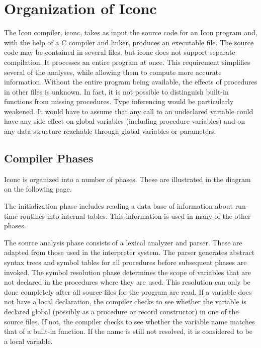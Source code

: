 \chapter{Organization of Iconc}

The Icon compiler, iconc, takes as input the source code for an Icon
program and, with the help of a C compiler and linker, produces an
executable file. The source code may be contained in several files,
but iconc does not support separate compilation. It processes an
entire program at once. This requirement simplifies several of the
analyses, while allowing them to compute more accurate
information. Without the entire program being available, the effects
of procedures in other files is unknown. In fact, it is not possible
to distinguish built-in functions from missing procedures. Type
inferencing would be particularly weakened. It would have to assume
that any call to an undeclared variable could have any side effect on
global variables (including procedure variables) and on any data
structure reachable through global variables or parameters.


\section{Compiler Phases}

Iconc is organized into a number of phases. These are illustrated in
the diagram on the following page.

The initialization phase includes reading a data base of information
about run-time routines into internal tables. This information is used
in many of the other phases.

The source analysis phase consists of a lexical analyzer and
parser. These are adapted from those used in the interpreter
system. The parser generates abstract syntax trees and symbol tables
for all procedures before subsequent phases are invoked. The symbol
resolution phase determines the scope of variables that are not
declared in the procedures where they are used. This resolution can
only be done completely after all source files for the program are
read. If a variable does not have a local declaration, the compiler
checks to see whether the variable is declared global (possibly as a
procedure or record constructor) in one of the source files. If not,
the compiler checks to see whether the variable name matches that of a
built-in function. If the name is still not resolved, it is considered
to be a local variable.

